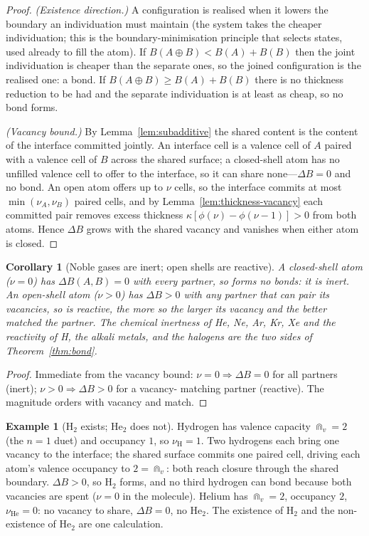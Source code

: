 \documentclass[11pt,twocolumn,a4paper]{article}
\theoremstyle{thmstyle}
\newtheorem{corollary}[theorem]{Corollary}
\theoremstyle{definition}
\newtheorem{example}[theorem]{Example}
\theoremstyle{remark}
\newcommand{\thick}{B}                 %
\newcommand{\vac}{\nu}                 %
\begin{document}
\begin{proof}
\emph{(Existence direction.)} A configuration is realised when it lowers
the boundary an individuation must maintain (the system takes the cheaper
individuation; this is the boundary-minimisation principle that selects
states, used already to fill the atom). If
$\thick(A\!\oplus\!B)<\thick(A)+\thick(B)$ then the joint individuation is
cheaper than the separate ones, so the joined configuration is the
realised one: a bond. If
$\thick(A\!\oplus\!B)\ge\thick(A)+\thick(B)$ there is no thickness reduction
to be had and the separate individuation is at least as cheap, so no bond
forms.

\emph{(Vacancy bound.)} By Lemma~\ref{lem:subadditive} the shared content
is the content of the interface committed jointly. An interface cell is a
valence cell of $A$ paired with a valence cell of $B$ across the shared
surface; a closed-shell atom has no unfilled valence cell to offer to the
interface, so it can share none---$\Delta\thick=0$ and no bond. An open
atom offers up to $\vac$ cells, so the interface commits at most
$\min(\vac_A,\vac_B)$ paired cells, and by
Lemma~\ref{lem:thickness-vacancy} each committed pair removes excess
thickness $\kappa[\phi(\vac)-\phi(\vac-1)]>0$ from both atoms. Hence
$\Delta\thick$ grows with the shared vacancy and vanishes when either
atom is closed.
\end{proof}

\begin{corollary}[Noble gases are inert; open shells are reactive]
\label{cor:noble}
A closed-shell atom ($\vac=0$) has $\Delta\thick(A,B)=0$ with every
partner, so forms no bonds: it is inert. An open-shell atom ($\vac>0$)
has $\Delta\thick>0$ with any partner that can pair its vacancies, so is
reactive, the more so the larger its vacancy and the better matched the
partner. The chemical inertness of He, Ne, Ar, Kr, Xe and the reactivity
of H, the alkali metals, and the halogens are the two sides of
Theorem~\ref{thm:bond}.
\end{corollary}

\begin{proof}
Immediate from the vacancy bound: $\vac=0\Rightarrow\Delta\thick=0$ for
all partners (inert); $\vac>0\Rightarrow\Delta\thick>0$ for a vacancy-
matching partner (reactive). The magnitude orders with vacancy and match.
\end{proof}

\begin{example}[H$_2$ exists; He$_2$ does not]
\label{ex:h2}
Hydrogen has valence capacity $\Cap_v=2$ (the $n=1$ duet) and occupancy
$1$, so $\vac_{\mathrm H}=1$. Two hydrogens each bring one vacancy to the
interface; the shared surface commits one paired cell, driving each
atom's valence occupancy to $2=\Cap_v$: both reach closure through the
shared boundary. $\Delta\thick>0$, so H$_2$ forms, and no third hydrogen
can bond because both vacancies are spent ($\vac=0$ in the molecule).
Helium has $\Cap_v=2$, occupancy $2$, $\vac_{\mathrm{He}}=0$: no vacancy
to share, $\Delta\thick=0$, no He$_2$. The existence of H$_2$ and the
non-existence of He$_2$ are one calculation.
\end{example}
\end{document}
